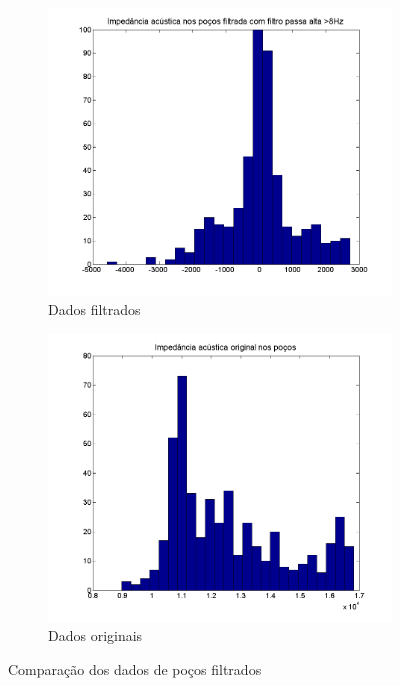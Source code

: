 \begin{figure}
        \centering
        \begin{subfigure}[b]{0.45\textwidth}
                \includegraphics[width=\textwidth]{fig/IA_com_filtro}
                \caption{Dados filtrados}
        \end{subfigure}%
        \hfill
        \begin{subfigure}[b]{0.45\textwidth}
                \includegraphics[width=\textwidth]{fig/IA_sem_filtro}
                \caption{Dados originais}
        \end{subfigure}
        \caption{Comparação dos dados de poços filtrados}\label{fig:pocoFilteN}
\end{figure}






